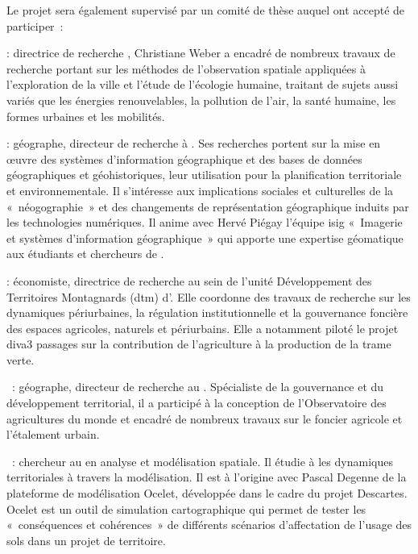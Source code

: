 Le projet sera également supervisé par un comité de thèse auquel ont accepté de participer~:

 : directrice de recherche {\CNRS}, %
Christiane Weber a encadré de nombreux travaux de recherche portant sur les méthodes de l'observation spatiale
appliquées à l'exploration de la ville et l'étude de l'écologie humaine,
traitant de sujets aussi variés que les énergies renouvelables, la pollution de l'air, la santé humaine,
les formes urbaines et les mobilités.

 : géographe, directeur de recherche à {\EVS}. Ses recherches portent sur la mise en œuvre des
systèmes d'information géographique et des bases de données géographiques et géohistoriques,
leur utilisation pour la planification territoriale et environnementale.
Il s'intéresse aux implications sociales et culturelles de la « néogographie » et des changements
de représentation géographique induits par les technologies numériques.
Il anime avec Hervé Piégay l'équipe {\sc isig} « Imagerie et systèmes d'information géographique »
qui apporte une expertise géomatique aux étudiants et chercheurs de {\EVS}.

 : économiste, directrice de recherche au sein de l'unité
Développement des Territoires Montagnards ({\sc dtm}) d'{\IRSTEA}.
Elle coordonne des travaux de recherche sur les dynamiques périurbaines, la régulation institutionnelle et la gouvernance foncière
des espaces agricoles, naturels et périurbains. Elle a notamment piloté le projet {\sc diva3 passages} sur la contribution de l'agriculture
à la production de la trame verte.

 : géographe, directeur de recherche au {\CIRAD}. Spécialiste de la gouvernance et du développement territorial,
il a participé à la conception de l'Observatoire des agricultures du monde et encadré de nombreux travaux
sur le foncier agricole et l'étalement urbain.

 : chercheur au {\CIRAD} en analyse et modélisation spatiale.
Il étudie à {\TETIS} les dynamiques territoriales à travers la modélisation.
Il est à l'origine avec Pascal Degenne de la plateforme de modélisation Ocelet, développée dans le cadre du projet {\ANR} Descartes.
Ocelet est un outil de simulation cartographique qui permet de tester les « conséquences et cohérences »
de différents scénarios d'affectation de l'usage des sols dans un projet de territoire.

